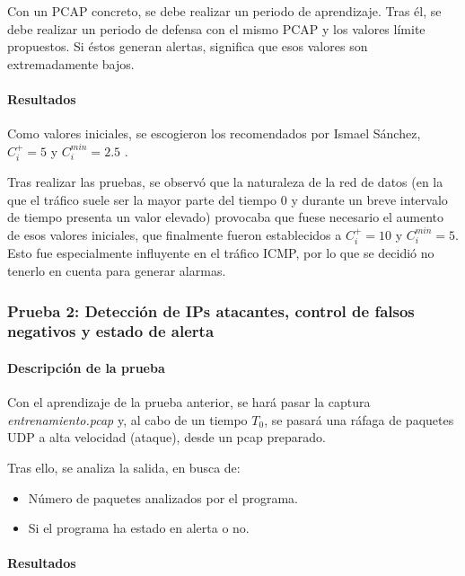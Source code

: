 Con un PCAP concreto, se debe realizar un periodo de aprendizaje. Tras él, se debe realizar un
periodo de defensa con el mismo PCAP y los valores límite propuestos. Si éstos generan alertas,
significa que esos valores son extremadamente bajos.

\paragraph{Resultados}\mbox{}

Como valores iniciales, se escogieron los recomendados por Ismael Sánchez, $C_i^+=5$ y $C_i^{min}=2.5$
 \cite{CUSUM_Carlos_III}.

Tras realizar las pruebas, se observó que la naturaleza de la red de datos (en la que el tráfico suele ser la 
mayor parte del tiempo $0$ y durante un breve intervalo de tiempo presenta un valor elevado) provocaba que fuese necesario
el aumento de esos valores iniciales, que finalmente fueron establecidos a $C_i^+=10$ y $C_i^{min}=5$. Esto fue
especialmente influyente en el tráfico \gls{ICMP}, por lo que se decidió no tenerlo en cuenta para generar alarmas.

\subsubsection{Prueba 2: Detección de IPs atacantes, control de falsos negativos y estado de 
alerta}
\paragraph{Descripción de la prueba}\mbox{}

Con el aprendizaje de la prueba anterior, se hará pasar 
la captura \emph{entrenamiento.pcap} y, al cabo de un tiempo $T_0$, 
se pasará una ráfaga de paquetes UDP a alta velocidad (ataque), desde un pcap preparado.

Tras ello, se analiza la salida, en busca de:
\begin{itemize}
 \item Número de paquetes analizados por el programa.
 \item Si el programa ha estado en alerta o no.
\end{itemize}

\paragraph{Resultados}\mbox{}

